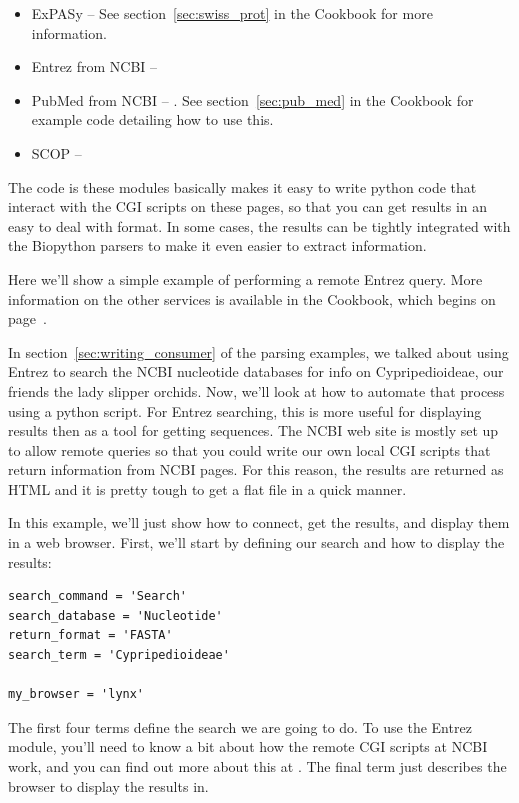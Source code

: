 \documentclass{report}
\begin{document}
\begin{itemize}
  \item ExPASy --  See section~\ref{sec:swiss_prot} in the Cookbook for more information.
  \item Entrez from NCBI -- 
  \item PubMed from NCBI -- . See section~\ref{sec:pub_med} in the Cookbook for example code detailing how to use this.
  \item SCOP -- 
\end{itemize}

The code is these modules basically makes it easy to write python code that interact with the CGI scripts on these pages, so that you can get results in an easy to deal with format. In some cases, the results can be tightly integrated with the Biopython parsers to make it even easier to extract information.


Here we'll show a simple example of performing a remote Entrez query. More information on the other services is available in the Cookbook, which begins on page~\pageref{sec:cookbook}.


In section~\ref{sec:writing_consumer} of the parsing examples, we talked about using Entrez to search the NCBI nucleotide databases for info on Cypripedioideae, our friends the lady slipper orchids. Now, we'll look at how to automate that process using a python script. For Entrez searching, this is more useful for displaying results then as a tool for getting sequences. The NCBI web site is mostly set up to allow remote queries so that you could write our own local CGI scripts that return information from NCBI pages. For this reason, the results are returned as HTML and it is pretty tough to get a flat file in a quick manner.


In this example, we'll just show how to connect, get the results, and display them in a web browser. First, we'll start by defining our search and how to display the results:

\begin{verbatim}
search_command = 'Search'
search_database = 'Nucleotide'
return_format = 'FASTA'
search_term = 'Cypripedioideae'

my_browser = 'lynx'
\end{verbatim}

The first four terms define the search we are going to do. To use the Entrez module, you'll need to know a bit about how the remote CGI scripts at NCBI work, and you can find out more about this at . The final term just describes the browser to display the results in.
\end{document}
